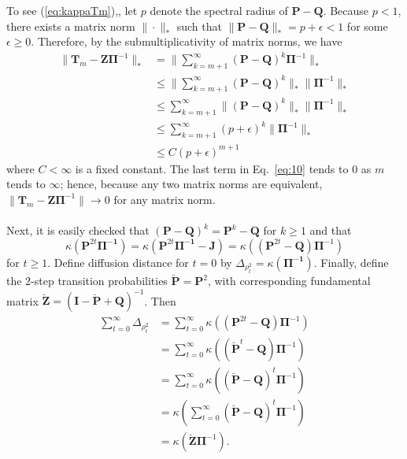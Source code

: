 \documentclass[10pt,twocolumn]{article}
\numberwithin{equation}{section}
\begin{document}
\noindent
To see (\ref{eq:kappaTm}),, 
let $p$ denote the spectral radius of
$\mathbf{P} - \mathbf{Q}$. 
Because $p < 1$, there exists a matrix norm
$\| \cdot \|_*$ such that $\| \mathbf{P} - \mathbf{Q} \|_* = p + \epsilon
< 1$ for some $\epsilon \geq 0$. Therefore, by the submultiplicativity
of matrix norms, we have
\begin{equation}
  \label{eq:10}
  \begin{split}
  \| \mathbf{T}_m - \mathbf{Z}\bm{\Pi}^{-1} \|_* &=
  \|\sum_{k=m+1}^{\infty}(\mathbf{P} - \mathbf{Q})^{k}\bm{\Pi}^{-1}
    \|_* \\
   &\leq \| \sum_{k=m+1}^{\infty}(\mathbf{P} - \mathbf{Q})^{k} \|_*
   \|\bm{\Pi}^{-1} \|_* \\
   &\leq \sum_{k=m+1}^{\infty} \|(\mathbf{P} - \mathbf{Q})^{k} \|_* \|
   \bm{\Pi}^{-1} \|_* \\
    &\leq \sum_{k=m+1}^{\infty} (p+\epsilon)^{k} \| \bm{\Pi}^{-1} \|_* \\
    &\leq C (p+\epsilon)^{m+1}
  \end{split}
\end{equation}
where $C < \infty$ is a fixed constant. 
The last term in Eq.~\eqref{eq:10} tends to $0$ as $m$ tends to $\infty$; hence,
because any two matrix norms are equivalent,
 $\|
\mathbf{T}_m - \mathbf{Z}\bm{\Pi}^{-1} \| \rightarrow 0$ for any
matrix norm. \\ \\
%
\noindent
Next, it is easily checked that $(\mathbf{P}-\mathbf{Q})^k =
\mathbf{P}^k-\mathbf{Q}$ for $k \geq 1$
and that
\begin{equation*}
\kappa(\mathbf{P}^{2t}\bm{\Pi^{-1}}) =
\kappa(\mathbf{P}^{2t}\bm{\Pi^{-1}} - \mathbf{J}) =
\kappa((\mathbf{P}^{2t} - \mathbf{Q}) \bm{\Pi}^{-1})
\end{equation*}
for $t \geq 1$.  Define diffusion distance for $t=0$ by
$\Delta_{\rho_{t}^2} = \kappa (\bm{\Pi^{-1}})$.
Finally, define the $2$-step transition probabilities
$\breve{\mathbf{P}} = \mathbf{P}^{2}$, with corresponding
fundamental matrix 
$\breve{\mathbf{Z}} = ( \mathbf{I} - \breve{\mathbf{P}} + \mathbf{Q})^{-1}$.
Then
 \begin{equation}
   \label{eq:16}
   \begin{split}
 \sum_{t = 0}^{\infty} \Delta_{\rho_{t}^{2}} &=
 \sum_{t=0}^\infty \kappa \left( \left( \mathbf{P}^{2t}-\mathbf{Q} \right) 
 \bm{\Pi}^{-1} \right) \\
   &= \sum_{t=0}^{\infty} \kappa \left( (\breve{\mathbf{P}}^t -
     \mathbf{Q}) \bm{\Pi}^{-1} \right) \\
   &= \sum_{t=0}^\infty \kappa \left( ( \breve{\mathbf{P}} - \mathbf{Q}
 )^t \bm{\Pi}^{-1} \right) \\
   &= \kappa \left(\sum_{t=0}^\infty \left( \breve{\mathbf{P}} - \mathbf{Q}
 \right)^t \bm{\Pi}^{-1} \right) \\
   &= \kappa \left( \breve{\mathbf{Z}} \bm{\Pi}^{-1} \right).
   \end{split}
 \end{equation}
\end{document}
